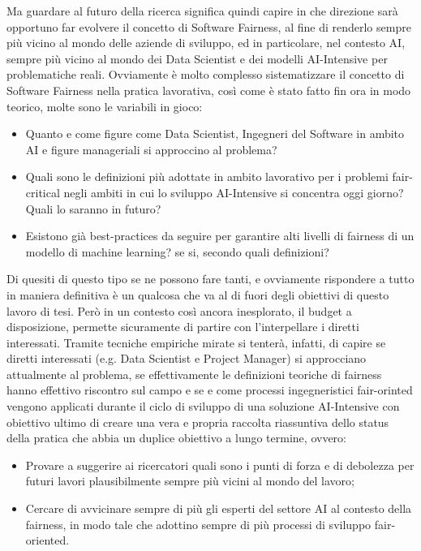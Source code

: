 Ma guardare al futuro della ricerca significa quindi capire in che direzione sarà opportuno far evolvere il concetto di Software Fairness, al fine di renderlo sempre più vicino al mondo delle aziende di sviluppo, ed in particolare, nel contesto AI, sempre più vicino al mondo dei Data Scientist e dei modelli AI-Intensive per problematiche reali. Ovviamente è molto complesso sistematizzare il concetto di Software Fairness nella pratica lavorativa, così come è stato fatto fin ora in modo teorico, molte sono le variabili in gioco:
\begin{itemize}
    \item Quanto e come figure come Data Scientist, Ingegneri del Software in ambito AI e figure manageriali si approccino al problema? 
    \item Quali sono le definizioni più adottate in ambito lavorativo per i problemi fair-critical negli ambiti in cui lo sviluppo AI-Intensive si concentra oggi giorno? Quali lo saranno in futuro? 
    \item Esistono già best-practices da seguire per garantire alti livelli di fairness di un modello di machine learning? se si, secondo quali definizioni? 
\end{itemize}
 Di quesiti di questo tipo se ne possono fare tanti, e ovviamente rispondere a tutto in maniera definitiva è un qualcosa che va al di fuori degli obiettivi di questo lavoro di tesi. Però in un contesto così ancora inesplorato, il budget a disposizione, permette sicuramente di partire con l'interpellare i diretti interessati. Tramite tecniche empiriche mirate si tenterà, infatti, di capire se diretti interessati (e.g. Data Scientist e Project Manager) si approcciano attualmente al problema, se effettivamente le definizioni teoriche di fairness hanno effettivo riscontro sul campo e se e come processi ingegneristici fair-orinted vengono applicati durante il ciclo di sviluppo di una soluzione AI-Intensive con obiettivo ultimo di creare una vera e propria raccolta riassuntiva dello status della pratica che abbia un duplice obiettivo a lungo termine, ovvero:
 
 \begin{itemize}
     \item Provare a suggerire  ai ricercatori quali sono i punti di forza e di debolezza per futuri lavori plausibilmente sempre più vicini al mondo del lavoro;
     \item Cercare di avvicinare sempre di più gli esperti del settore AI al contesto della fairness, in modo tale che adottino sempre di più processi di sviluppo fair-oriented.
 \end{itemize}


\newpage